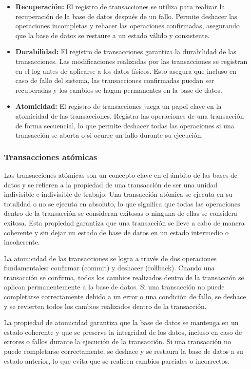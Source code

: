 \begin{itemize}
	\item \textbf{Recuperación:} El registro de transacciones se utiliza para realizar la recuperación de la base de datos después de un fallo. Permite deshacer las operaciones incompletas y rehacer las operaciones confirmadas, asegurando que la base de datos se restaure a un estado válido y consistente.
	\item \textbf{Durabilidad:} El registro de transacciones garantiza la durabilidad de las transacciones. Las modificaciones realizadas por las transacciones se registran en el log antes de aplicarse a los datos físicos. Esto asegura que incluso en caso de fallo del sistema, las transacciones confirmadas puedan ser recuperadas y los cambios se hagan permanentes en la base de datos.
	\item \textbf{Atomicidad:} El registro de transacciones juega un papel clave en la atomicidad de las transacciones. Registra las operaciones de una transacción de forma secuencial, lo que permite deshacer todas las operaciones si una transacción se aborta o si ocurre un fallo durante su ejecución.
\end{itemize}

\subsubsection{Transacciones atómicas}
\noindent
Las transacciones atómicas son un concepto clave en el ámbito de las bases de datos y se refieren a la propiedad de una transacción de ser una unidad indivisible e indivisible de trabajo. Una transacción atómica se ejecuta en su totalidad o no se ejecuta en absoluto, lo que significa que todas las operaciones dentro de la transacción se consideran exitosas o ninguna de ellas se considera exitosa. Esta propiedad garantiza que una transacción se lleve a cabo de manera coherente y sin dejar un estado de base de datos en un estado intermedio o incoherente.

La atomicidad de las transacciones se logra a través de dos operaciones fundamentales: confirmar (commit) y deshacer (rollback). Cuando una transacción se confirma, todos los cambios realizados dentro de la transacción se aplican permanentemente a la base de datos. Si una transacción no puede completarse correctamente debido a un error o una condición de fallo, se deshace y se revierten todos los cambios realizados dentro de la transacción.

La propiedad de atomicidad garantiza que la base de datos se mantenga en un estado coherente y que se preserve la integridad de los datos, incluso en caso de errores o fallos durante la ejecución de la transacción. Si una transacción no puede completarse correctamente, se deshace y se restaura la base de datos a su estado anterior, lo que evita que se realicen cambios parciales o incorrectos.

